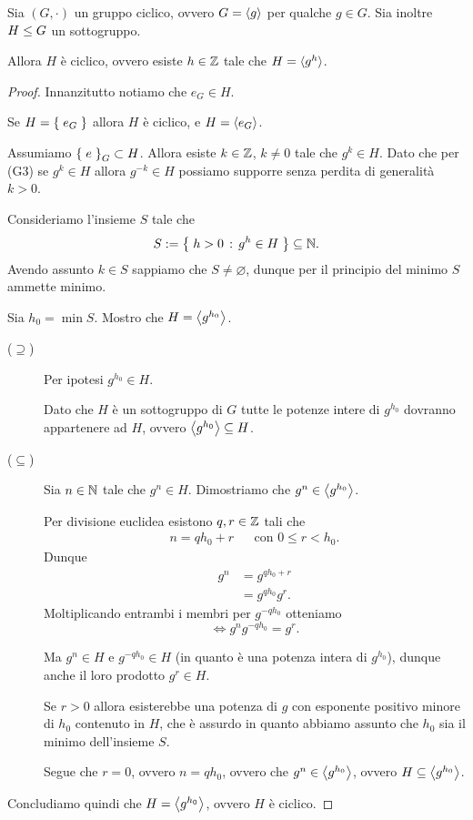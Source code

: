 \begin{theorem}
     \label{th:sottogr_ciclico}
    Sia $(G, \cdot)$ un gruppo ciclico, ovvero $G = \gen{g}$ per qualche $g \in G$. Sia inoltre $H \sgr G$ un sottogruppo.

    Allora $H$ è ciclico, ovvero esiste $h \in \Z$ tale che $H = \gen{g^h}$.
\end{theorem}
\begin{proof}
    Innanzitutto notiamo che $e_G \in H$. 
    
    Se $H = \set{e_G}$ allora $H$ è ciclico, e $H = \gen{e_G}$.

    Assumiamo $\set e_G \subset H$. Allora esiste $k \in \Z$, $k \neq 0$ tale che $g^k \in H$. 
    Dato che per (G3) se $g^k \in H$ allora $g^{-k} \in H$ possiamo supporre senza perdita di generalità $k > 0$.

    Consideriamo l'insieme $S$ tale che \[
        S \deq \set{h > 0 \suchthat g^h \in H} \subseteq \N.    
    \] Avendo assunto $k \in S$ sappiamo che $S \neq \varnothing$, dunque per il principio del minimo $S$ ammette minimo.

    Sia $h_0 = \min S$. Mostro che $H = \gen*{g^{h_0}}$.
    \begin{description}
        \item[($\supseteq$)] Per ipotesi $g^{h_0} \in H$. 
        
        Dato che $H$ è un sottogruppo di $G$ tutte le potenze intere di $g^{h_0}$ dovranno appartenere ad $H$, ovvero $\gen*{g^{h_0}} \subseteq H$.
        \item[($\subseteq$)] Sia $n \in \N$ tale che $g^n \in H$. Dimostriamo che $g^n \in \gen*{g^{h_0}}$.
        
        Per divisione euclidea esistono $q, r \in \Z$ tali che \begin{align*}
            n = qh_0 + r &&\text{con } 0 \leq r < h_0.
        \end{align*}
        Dunque \begin{align*}
            g^n &= g^{qh_0 + r}\\
                &= g^{qh_0}g^r.
        \end{align*}
        Moltiplicando entrambi i membri per $g^{-qh_0}$ otteniamo \[
            \iff g^ng^{-qh_0} = g^r.
        \]

        Ma $g^n \in H$ e $g^{-qh_0} \in H$ (in quanto è una potenza intera di $g^{h_0}$), dunque anche il loro prodotto $g^r \in H$.

        Se $r > 0$ allora esisterebbe una potenza di $g$ con esponente positivo minore di $h_0$ contenuto in $H$, che è assurdo in quanto abbiamo assunto che $h_0$ sia il minimo dell'insieme $S$.
        
        Segue che $r = 0$, ovvero $n = qh_0$, ovvero che $g^n \in \gen*{g^{h_0}}$, ovvero $H \subseteq \gen*{g^{h_0}}$.
    \end{description}

    Concludiamo quindi che $H = \gen*{g^{h_0}}$, ovvero $H$ è ciclico.
\end{proof}


